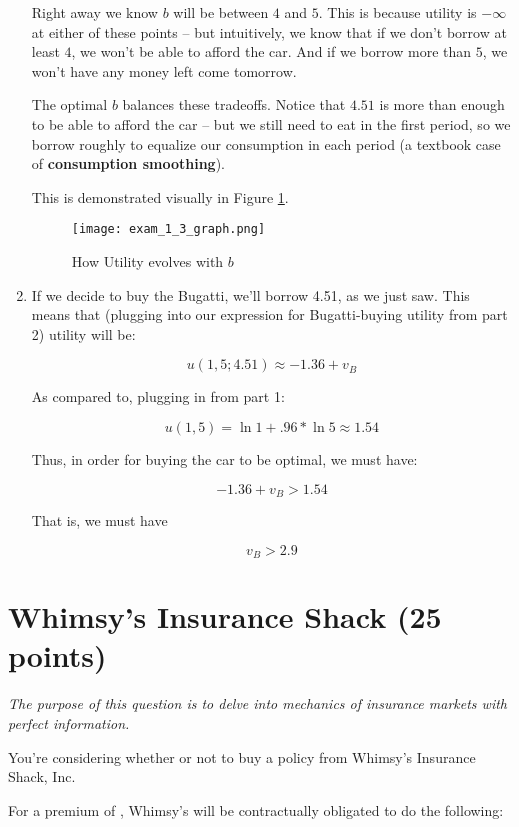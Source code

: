 \documentclass{article}
\newenvironment{solution}{\color{red}}{\color{black}}
\begin{document}
\begin{solution}
\begin{enumerate}
Right away we know $b$ will be between $4$ and $5$. This is because utility is $-\infty$ at either of these points -- but intuitively, we know that if we don't borrow at least $4$, we won't be able to afford the car. And if we borrow more than $5$, we won't have any money left come tomorrow.

The optimal $b$ balances these tradeoffs. Notice that $4.51$ is more than enough to be able to afford the car -- but we still need to eat in the first period, so we borrow roughly to equalize our consumption in each period (a textbook case of \textbf{consumption smoothing}).

This is demonstrated visually in Figure \ref{bugatti}.

\begin{figure}[htbp]
\centering
\texttt{[image: exam\_1\_3\_graph.png]}
\caption{How Utility evolves with $b$}
\label{bugatti}
\end{figure}

\item If we decide to buy the Bugatti, we'll borrow 4.51, as we just saw. This means that (plugging into our expression for Bugatti-buying utility from part 2) utility will be:

\[ u(1, 5; 4.51) \approx -1.36 + v_B \]

As compared to, plugging in from part 1:

\[ u(1, 5) = \ln 1 + .96 * \ln 5 \approx 1.54 \]

Thus, in order for buying the car to be optimal, we must have:

\[ -1.36 + v_B > 1.54 \]

That is, we must have

\[ v_B > 2.9 \]
\end{enumerate}
\end{solution}

\section*{Whimsy's Insurance Shack (25 points)}

\small{\textit{The purpose of this question is to delve into mechanics of insurance markets with perfect information.}}

You're considering whether or not to buy a policy from Whimsy's Insurance Shack, Inc.

For a premium of , Whimsy's will be contractually obligated to do the following:
\end{document}
